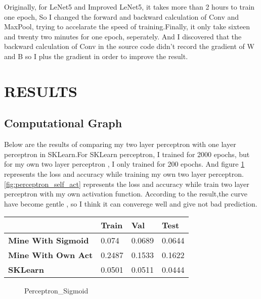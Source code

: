 \documentclass[conference]{IEEEtran}
\begin{document}
    \indent Originally, for LeNet5 and Improved LeNet5, it takes more than 2 hours to train one epoch, So I changed the forward and backward calculation of Conv and MaxPool, trying to accelarate the speed of training.Finally, it only take sixteen and twenty two minutes for one epoch, seperately.
    \indent And I discovered that the backward calculation of Conv in the source code didn't record the gradient of W and B so I plus the gradient in order to improve the result.

\section{RESULTS}
    \subsection{Computational Graph}
        Below are the results of comparing my two layer perceptron with one layer perceptron in SKLearn.For SKLearn perceptron, I trained for 2000 epochs, but for my own two layer perceptron , I only trained for 200 epochs. And figure \ref{fig:perceptron} represents the loss and accuracy while training my own two layer perceptron.\ref{fig:perceptron_self_act} represents the loss and accuracy while train two layer perceptron with my own activation function. According to the result,the curve have become gentle , so I think it can converege well and give not bad prediction.
        \begin{table}[htb]
        \begin{center}
            \begin{tabular}{l|l|l|l}
                             &   Train   &   Val  &   Test  \\ \hline
            \textbf{Mine With Sigmoid}    &   0.074  & 0.0689 & 0.0644 \\ 
            \textbf{Mine With Own Act}    &   0.2487  & 0.1533 & 0.1622  \\ 
            \textbf{SKLearn} &   0.0501  & 0.0511 & 0.0444  \\ 
        \end{tabular}
        \end{center}
        \end{table}
        

        \begin{figure}[htb]
            \centering
            \renewcommand{\figurename}{Figure}
            \caption{Perceptron\_Sigmoid}
            \label{fig:perceptron}
        \end{figure}
\end{document}
